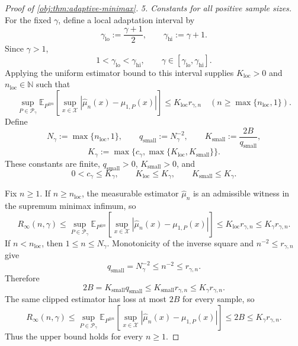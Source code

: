 \documentclass[11pt]{article}
\begin{document}
\begin{proof}[Proof of \cref{obj:thm:adaptive-minimax}]
\emph{5. Constants for all positive sample sizes.}
For the fixed \(\gamma\), define a local adaptation interval by
\[
\gamma_{\mathrm{lo}}:=\frac{\gamma+1}{2},
\qquad
\gamma_{\mathrm{hi}}:=\gamma+1.
\]
Since \(\gamma>1\),
\[
1<\gamma_{\mathrm{lo}}<\gamma_{\mathrm{hi}},
\qquad
\gamma\in[\gamma_{\mathrm{lo}},\gamma_{\mathrm{hi}}].
\]
Applying the uniform estimator bound to this interval supplies \(K_{\mathrm{loc}}>0\) and \(n_{\mathrm{loc}}\in\mathbb N\) such that
\[
\sup_{P\in\mathcal P_\gamma}
\mathbb E_{P^{\otimes n}}
\left[
\sup_{x\in\mathcal X}
|\widehat\mu_n(x)-\mu_{1,P}(x)|
\right]
\le K_{\mathrm{loc}}r_{\gamma,n}
\quad(n\ge\max\{n_{\mathrm{loc}},1\}).
\]
Define
\[
N_\gamma:=\max\{n_{\mathrm{loc}},1\},
\qquad
q_{\mathrm{small}}:=N_\gamma^{-2},
\qquad
K_{\mathrm{small}}:=\frac{2B}{q_{\mathrm{small}}},
\]
\[
K_\gamma
:=
\max\{c_\gamma,\max\{K_{\mathrm{loc}},K_{\mathrm{small}}\}\}.
\]
These constants are finite, \(q_{\mathrm{small}}>0\), \(K_{\mathrm{small}}>0\), and
\[
0<c_\gamma\le K_\gamma,
\qquad
K_{\mathrm{loc}}\le K_\gamma,
\qquad
K_{\mathrm{small}}\le K_\gamma.
\]

Fix \(n\ge1\). If \(n\ge n_{\mathrm{loc}}\), the measurable estimator \(\widehat\mu_n\) is an admissible witness in the supremum minimax infimum, so
\[
R_\infty(n,\gamma)
\le
\sup_{P\in\mathcal P_\gamma}
\mathbb E_{P^{\otimes n}}
\left[
\sup_{x\in\mathcal X}
|\widehat\mu_n(x)-\mu_{1,P}(x)|
\right]
\le K_{\mathrm{loc}}r_{\gamma,n}
\le K_\gamma r_{\gamma,n}.
\]
If \(n<n_{\mathrm{loc}}\), then \(1\le n\le N_\gamma\). Monotonicity of the inverse square and \(n^{-2}\le r_{\gamma,n}\) give
\[
q_{\mathrm{small}}
=N_\gamma^{-2}
\le n^{-2}
\le r_{\gamma,n}.
\]
Therefore
\[
2B
=K_{\mathrm{small}}q_{\mathrm{small}}
\le K_{\mathrm{small}}r_{\gamma,n}
\le K_\gamma r_{\gamma,n}.
\]
The same clipped estimator has loss at most \(2B\) for every sample, so
\[
R_\infty(n,\gamma)
\le
\sup_{P\in\mathcal P_\gamma}
\mathbb E_{P^{\otimes n}}
\left[
\sup_{x\in\mathcal X}
|\widehat\mu_n(x)-\mu_{1,P}(x)|
\right]
\le2B
\le K_\gamma r_{\gamma,n}.
\]
Thus the upper bound holds for every \(n\ge1\).


\end{proof}
\end{document}
